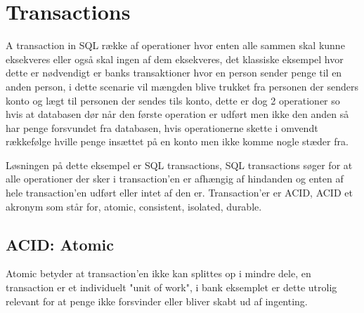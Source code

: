 
\section{Transactions}\label{sec:transactions}
A transaction in SQL række af operationer hvor enten alle sammen skal kunne eksekveres eller også skal ingen af dem eksekveres, det klassiske eksempel hvor dette er nødvendigt er banks transaktioner hvor en person sender penge til en anden person, i dette scenarie vil mængden blive trukket fra personen der senders konto og lægt til personen der sendes tils konto, dette er dog 2 operationer so hvis at databasen dør når den første operation er udført men ikke den anden så har penge forsvundet fra databasen, hvis operationerne skette i omvendt rækkefølge hville penge insættet på en konto men ikke komme nogle stæder fra. 

Løsningen på dette eksempel er SQL transactions, SQL transactions søger for at alle operationer der sker i transaction'en er afhængig af hindanden og enten af hele transaction'en udført eller intet af den er. Transaction'er er ACID, ACID et akronym som står for, atomic, consistent, isolated, durable.

\subsection{ACID: Atomic}\label{sec:acidAtomic}
Atomic betyder at transaction'en ikke kan splittes op i mindre dele, en transaction er et individuelt "unit of work", i bank eksemplet er dette utrolig relevant for at penge ikke forsvinder eller bliver skabt ud af ingenting. 


